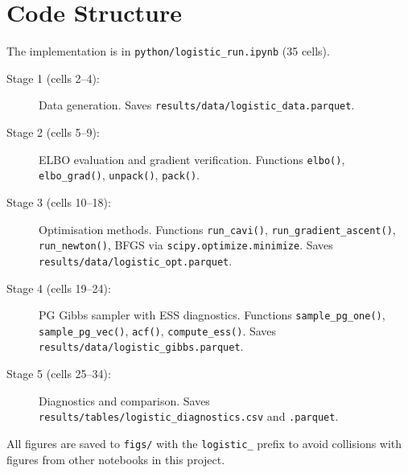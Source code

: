 \documentclass[11pt,a4paper]{article}
\begin{document}
\newpage
\section{Code Structure}
\label{app:code}

The implementation is in \texttt{python/logistic\_run.ipynb} (35 cells).

\begin{description}
  \item[Stage 1 (cells 2--4):] Data generation.
    Saves \texttt{results/data/logistic\_data.parquet}.
  \item[Stage 2 (cells 5--9):] ELBO evaluation and gradient verification.
    Functions \texttt{elbo()}, \texttt{elbo\_grad()}, \texttt{unpack()}, \texttt{pack()}.
  \item[Stage 3 (cells 10--18):] Optimisation methods.
    Functions \texttt{run\_cavi()}, \texttt{run\_gradient\_ascent()},
    \texttt{run\_newton()}, BFGS via \texttt{scipy.optimize.minimize}.
    Saves \texttt{results/data/logistic\_opt.parquet}.
  \item[Stage 4 (cells 19--24):] PG Gibbs sampler with ESS diagnostics.
    Functions \texttt{sample\_pg\_one()}, \texttt{sample\_pg\_vec()},
    \texttt{acf()}, \texttt{compute\_ess()}.
    Saves \texttt{results/data/logistic\_gibbs.parquet}.
  \item[Stage 5 (cells 25--34):] Diagnostics and comparison.
    Saves \texttt{results/tables/logistic\_diagnostics.csv} and \texttt{.parquet}.
\end{description}

All figures are saved to \texttt{figs/} with the \texttt{logistic\_} prefix to avoid
collisions with figures from other notebooks in this project.
\end{document}

